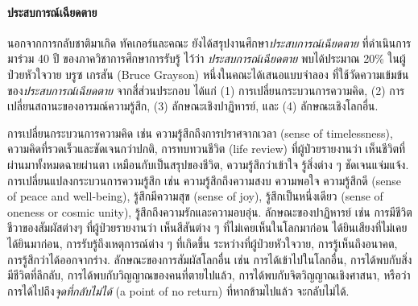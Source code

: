 {\begin{shaded}
\vspace{0.5cm}		
\begin{Parallel}[c]{0.5\textwidth}{0.36\textwidth}
\end{Parallel}
		
		
		
		\paragraph{\small ประสบการณ์เฉียดตาย}
		นอกจากการกลับชาติมาเกิด ทัคเกอร์และคณะ\cite{TuckerEtAl2017a} ยังได้สรุปงานศึกษา\textit{ประสบการณ์เฉียดตาย} ที่ดำเนินการมาร่วม 40 ปี ของภาควิชาการศึกษาการรับรู้ ไว้ว่า
		\textit{ประสบการณ์เฉียดตาย} พบได้ประมาณ 20\% ในผู้ป่วยหัวใจวาย %
		บรูซ เกรสัน (Bruce Grayson) หนึ่งในคณะได้เสนอแบบจำลอง ที่ใช้วัดความเข้มข้นของ\textit{ประสบการณ์เฉียดตาย} จากสี่ส่วนประกอบ
		ได้แก่ (1) การเปลี่ยนกระบวนการความคิด,
		(2) การเปลี่ยนสถานะของอารมณ์ความรู้สึก,
		(3) ลักษณะเชิงปาฏิหารย์,
		และ (4) ลักษณะเชิงโลกอื่น.
		
		การเปลี่ยนกระบวนการความคิด เช่น ความรู้สึกถึงการปราศจากเวลา (sense of timelessness),
		ความคิดที่รวดเร็วและชัดเจนกว่าปกติ, 
		การทบทวนชีวิต (life review) ที่ผู้ป่วยรายงานว่า เห็นชีวิตที่ผ่านมาทั้งหมดฉายผ่านตา เหมือนกับเป็นสรุปของชีวิต,
		ความรู้สึกว่าเข้าใจ รู้สิ่งต่าง ๆ ชัดเจนแจ่มแจ้ง.
		การเปลี่ยนแปลงกระบวนการความรู้สึก เช่น 
		ความรู้สึกถึงความสงบ ความพอใจ ความรู้สึกดี (sense of peace and well-being), 
		รู้สึกมีความสุข (sense of joy), 
		รู้สึกเป็นหนึ่งเดียว (sense of oneness or cosmic unity), รู้สึกถึงความรักและความอบอุ่น.
		ลักษณะของปาฏิหารย์ เช่น การมีชีวิตชีวาของสัมผัสต่างๆ ที่ผู้ป่วยรายงานว่า เห็นสีสันต่าง ๆ ที่ไม่เคยเห็นในโลกมาก่อน ได้ยินเสียงที่ไม่เคยได้ยินมาก่อน,
		การรับรู้ถึงเหตุการณ์ต่าง ๆ ที่เกิดขึ้น ระหว่างที่ผู้ป่วยหัวใจวาย,
		การรู้เห็นถึงอนาคต, การรู้สึกว่าได้ออกจากร่าง.
		ลักษณะของการสัมผัสโลกอื่น เช่น การได้เข้าไปในโลกอื่น, 
		การได้พบกับสิ่งมีชีวิตที่ลึกลับ,
		การได้พบกับวิญญาณของคนที่ตายไปแล้ว,
		การได้พบกับจิตวิญญาณเชิงศาสนา,
		หรือว่า การได้ไปถึง\textit{จุดที่กลับไม่ได้} (a point of no return) ที่หากข้ามไปแล้ว จะกลับไม่ได้.
		

\end{shaded}}
